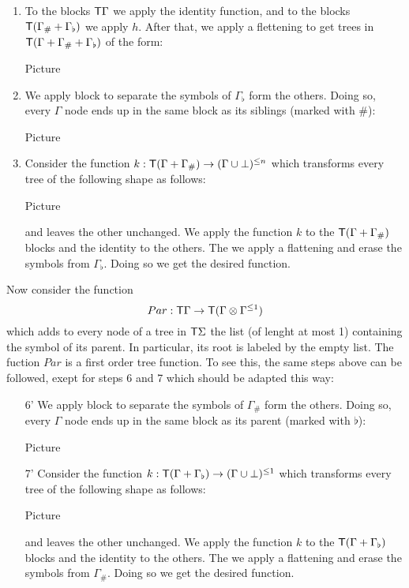 \begin{example}
\begin{enumerate}
\item To the blocks $\mathsf T \Gamma$ we apply the identity function, and to the blocks $\mathsf T(\Gamma_\#+\Gamma_\flat)$ we apply $h$. After that, we apply a flettening to get trees in $\mathsf T(\Gamma+\Gamma_\#+\Gamma_\flat)$ of the form:
\begin{center}
Picture
\end{center} 
\item We apply block to separate the symbols of $\Gamma_\flat$ form the others. Doing so, every $\Gamma$ node ends up in the same block as its siblings (marked with $\#$):
\begin{center}
Picture
\end{center}
\item Consider the function $k:\mathsf T(\Gamma+\Gamma_\#)\to (\Gamma\cup\bot)^{\leq n}$ which transforms every tree of the following shape as follows:
\begin{center}
Picture
\end{center}
and leaves the other unchanged. We apply the function $k$ to the $\mathsf T(\Gamma+\Gamma_\#)$
blocks and the identity to the others. The we apply a flattening and erase the symbols from $\Gamma_\flat$. Doing so we get the desired function.
\end{enumerate}
\medskip

Now consider the function $$Par:\mathsf T\Gamma\to \mathsf T (\Gamma\otimes \Gamma^{\leq 1})$$ which adds to every node of a tree in $\mathsf T \Sigma$ the list (of lenght at most 1) containing the symbol of its parent. In particular, its root is labeled by the empty list. 
The fuction $Par$ is a first order tree function. To see this, the same steps above can be followed, exept for steps 6 and 7 which should be adapted this way:
\begin{enumerate}
\item[6'] We apply block to separate the symbols of $\Gamma_\#$ form the others. Doing so, every $\Gamma$ node ends up in the same block as its parent (marked with $\flat$):
\begin{center}
Picture
\end{center}
\item[7'] Consider the function $k:\mathsf T(\Gamma+\Gamma_\flat)\to (\Gamma\cup\bot)^{\leq 1}$ which transforms every tree of the following shape as follows:
\begin{center}
Picture
\end{center}
and leaves the other unchanged. We apply the function $k$ to the $\mathsf T(\Gamma+\Gamma_\flat)$
blocks and the identity to the others. The we apply a flattening and erase the symbols from $\Gamma_\#$. Doing so we get the desired function.
\end{enumerate} 
\end{example}



